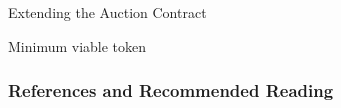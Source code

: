 \documentclass[]{beamer}
\begin{document}
\begin{frame}{Extending the Auction Contract}
	\begin{samplecode}{Minimum viable token}
		
	\end{samplecode}
\end{frame}


\begin{frame}%
\frametitle{References and Recommended Reading}
	
	
\end{frame}
\end{document}
